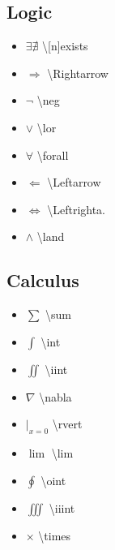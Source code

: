 \subsection*{Logic}
\begin{minipage}{3cm}
\begin{itemize}[label={}]
    \item $\exists\nexists$ \textbackslash [n]exists
    \item $\Rightarrow$ \textbackslash Rightarrow
    \item $\neg$ \textbackslash neg
    \item $\lor$ \textbackslash lor
\end{itemize} 
\end{minipage}
\begin{minipage}{3cm}
\begin{itemize}[label={}]
    \item $\forall$ \textbackslash forall
    \item $\Leftarrow$ \textbackslash Leftarrow
    \item $\Leftrightarrow$ \textbackslash Leftrighta.
    \item $\land$ \textbackslash land
\end{itemize} 
\end{minipage}


\subsection*{Calculus}

\begin{minipage}{3cm}
\begin{itemize}[label={}]
    \item $\sum$ \textbackslash sum
    \item $\int$ \textbackslash int 
    \item $\iint$ \textbackslash iint 
    \item $\nabla$ \textbackslash nabla 
    \item $\rvert_{x=0}$ \textbackslash rvert
\end{itemize} 
\end{minipage}
\begin{minipage}{3cm}
\begin{itemize}[label={}]
    \item $\lim$ \textbackslash lim
    \item $\oint$ \textbackslash oint 
    \item $\iiint$ \textbackslash iiint 
    \item $\times$ \textbackslash times
\end{itemize} 
\end{minipage}


